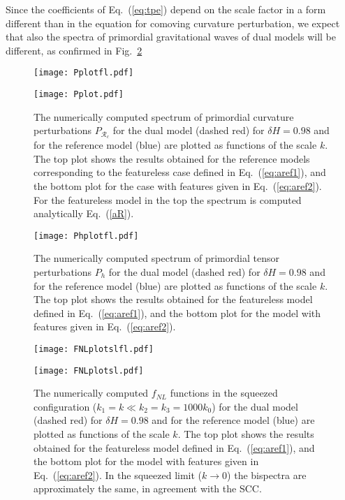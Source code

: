 \documentclass[aps,prl,amsmath,nofootinbib,twocolumn]{revtex4}
\newcommand{\3}{\partial}
\newcommand{\4}{\frac}
\newcommand{\5}{\delta}
\renewcommand\({\left(}
\renewcommand\){\right)}
\renewcommand\[{\left[}
\renewcommand\]{\right]}
\newcommand{\eqn}[1]{(\ref{#1})}
\begin{document}
Since the coefficients of Eq.~\eqn{eq:tpe} depend on the scale factor in a form different than in the equation for comoving curvature perturbation, we expect that also the spectra of primordial gravitational waves of dual models will be different, as confirmed in Fig.~\ref{fig:Phplot}

\begin{figure}
 \begin{minipage}{.45\textwidth}
  \texttt{[image: Pplotfl.pdf]}
  \end{minipage}
 \begin{minipage}{.45\textwidth}
  \texttt{[image: Pplot.pdf]}
 \end{minipage}
  \caption{The numerically computed spectrum of primordial curvature perturbations $P_{\mathcal{R}_c}$ for the dual model (dashed red) for $\delta H=0.98$ and for the reference model (blue) are plotted as functions of the scale $k$. The top plot shows the results obtained for the reference models corresponding to the featureless case defined in Eq.~\eqn{eq:aref1}, and the bottom plot for the case with features given in Eq.~\eqn{eq:aref2}. For the featureless model in the top the spectrum is computed analytically  Eq.~\eqn{aR}.
  }
\label{fig:Pplot}
\end{figure}

\begin{figure}
 \texttt{[image: Phplotfl.pdf]}
  \caption{The numerically computed spectrum of primordial tensor perturbations $P_{h}$ for the dual model (dashed red) for $\delta H=0.98$ and for the reference model (blue) are plotted as functions of the scale $k$. The top plot shows the results obtained for the featureless model defined in Eq.~\eqn{eq:aref1}, and the bottom plot for the model with features given in Eq.~\eqn{eq:aref2}.
  }
\label{fig:Phplot}
\end{figure}

\begin{figure}
 \begin{minipage}{.45\textwidth}
  \texttt{[image: FNLplotslfl.pdf]}
  \end{minipage}
 \begin{minipage}{.45\textwidth}
  \texttt{[image: FNLplotsl.pdf]}
 \end{minipage}
  \caption{The numerically computed $f_{NL}$ functions in the squeezed configuration ($k_1=k \ll k_2=k_3=1000 k_0$) for the dual model (dashed red) for $\delta H=0.98$ and for the reference model (blue) are plotted as functions of the scale $k$. The top plot shows the results obtained for the featureless model defined in Eq.~\eqn{eq:aref1}, and the bottom plot for the model with features given in Eq.~\eqn{eq:aref2}. In the squeezed limit ($k \rightarrow 0$) the bispectra are approximately the same, in agreement with the SCC.}
\label{fig:FNLsl}
\end{figure}
\end{document}
